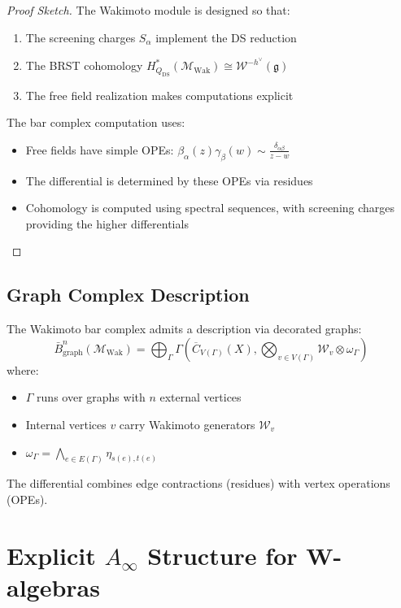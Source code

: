 \begin{proof}[Proof Sketch]
The Wakimoto module is designed so that:
\begin{enumerate}
\item The screening charges $S_\alpha$ implement the DS reduction
\item The BRST cohomology $H^*_{Q_{\text{DS}}}(\mathcal{M}_{\text{Wak}}) \cong \mathcal{W}^{-h^\vee}(\mathfrak{g})$
\item The free field realization makes computations explicit
\end{enumerate}
 
The bar complex computation uses:
\begin{itemize}
\item Free fields have simple OPEs: $\beta_\alpha(z)\gamma_\beta(w) \sim \frac{\delta_{\alpha\beta}}{z-w}$
\item The differential is determined by these OPEs via residues
\item Cohomology is computed using spectral sequences, with screening charges providing the higher differentials
\end{itemize}
\end{proof}
 
\subsection{Graph Complex Description}
 
\begin{proposition}
The Wakimoto bar complex admits a description via decorated graphs:
\[
\bar{B}^n_{\text{graph}}(\mathcal{M}_{\text{Wak}}) = \bigoplus_{\Gamma} 
\Gamma\left(\overline{C}_{V(\Gamma)}(X), \bigotimes_{v \in V(\Gamma)} \mathcal{W}_v \otimes \omega_\Gamma\right)
\]
where:
\begin{itemize}
\item $\Gamma$ runs over graphs with $n$ external vertices
\item Internal vertices $v$ carry Wakimoto generators $\mathcal{W}_v$
\item $\omega_\Gamma = \bigwedge_{e \in E(\Gamma)} \eta_{s(e),t(e)}$
\end{itemize}
The differential combines edge contractions (residues) with vertex operations (OPEs).
\end{proposition}
 
\section{Explicit $A_\infty$ Structure for W-algebras}
 
